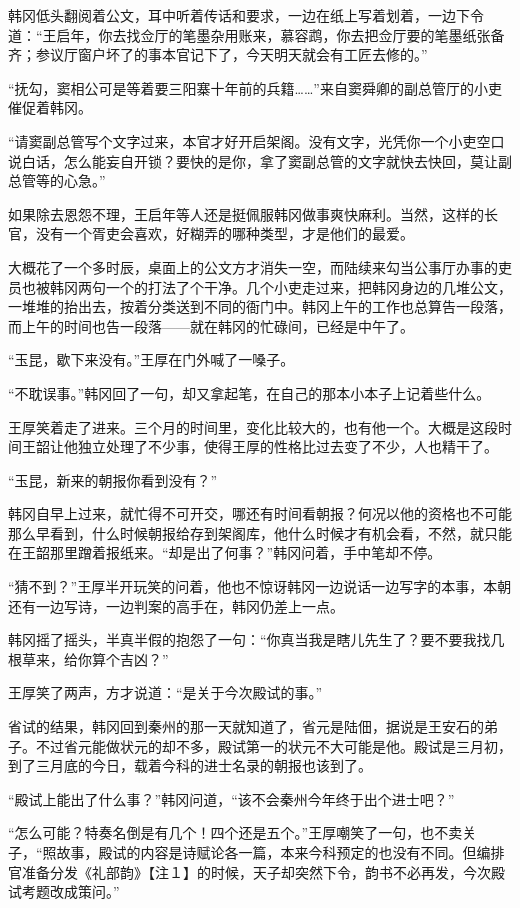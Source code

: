 韩冈低头翻阅着公文，耳中听着传话和要求，一边在纸上写着划着，一边下令道：“王启年，你去找佥厅的笔墨杂用账来，慕容鹉，你去把佥厅要的笔墨纸张备齐；参议厅窗户坏了的事本官记下了，今天明天就会有工匠去修的。”

“抚勾，窦相公可是等着要三阳寨十年前的兵籍……”来自窦舜卿的副总管厅的小吏催促着韩冈。

“请窦副总管写个文字过来，本官才好开启架阁。没有文字，光凭你一个小吏空口说白话，怎么能妄自开锁？要快的是你，拿了窦副总管的文字就快去快回，莫让副总管等的心急。”

如果除去恩怨不理，王启年等人还是挺佩服韩冈做事爽快麻利。当然，这样的长官，没有一个胥吏会喜欢，好糊弄的哪种类型，才是他们的最爱。

大概花了一个多时辰，桌面上的公文方才消失一空，而陆续来勾当公事厅办事的吏员也被韩冈两句一个的打法了个干净。几个小吏走过来，把韩冈身边的几堆公文，一堆堆的抬出去，按着分类送到不同的衙门中。韩冈上午的工作也总算告一段落，而上午的时间也告一段落——就在韩冈的忙碌间，已经是中午了。

“玉昆，歇下来没有。”王厚在门外喊了一嗓子。

“不耽误事。”韩冈回了一句，却又拿起笔，在自己的那本小本子上记着些什么。

王厚笑着走了进来。三个月的时间里，变化比较大的，也有他一个。大概是这段时间王韶让他独立处理了不少事，使得王厚的性格比过去变了不少，人也精干了。

“玉昆，新来的朝报你看到没有？”

韩冈自早上过来，就忙得不可开交，哪还有时间看朝报？何况以他的资格也不可能那么早看到，什么时候朝报给存到架阁库，他什么时候才有机会看，不然，就只能在王韶那里蹭着报纸来。“却是出了何事？”韩冈问着，手中笔却不停。

“猜不到？”王厚半开玩笑的问着，他也不惊讶韩冈一边说话一边写字的本事，本朝还有一边写诗，一边判案的高手在，韩冈仍差上一点。

韩冈摇了摇头，半真半假的抱怨了一句：“你真当我是瞎儿先生了？要不要我找几根草来，给你算个吉凶？”

王厚笑了两声，方才说道：“是关于今次殿试的事。”

省试的结果，韩冈回到秦州的那一天就知道了，省元是陆佃，据说是王安石的弟子。不过省元能做状元的却不多，殿试第一的状元不大可能是他。殿试是三月初，到了三月底的今日，载着今科的进士名录的朝报也该到了。

“殿试上能出了什么事？”韩冈问道，“该不会秦州今年终于出个进士吧？”

“怎么可能？特奏名倒是有几个！四个还是五个。”王厚嘲笑了一句，也不卖关子，“照故事，殿试的内容是诗赋论各一篇，本来今科预定的也没有不同。但编排官准备分发《礼部韵》【注１】的时候，天子却突然下令，韵书不必再发，今次殿试考题改成策问。”

